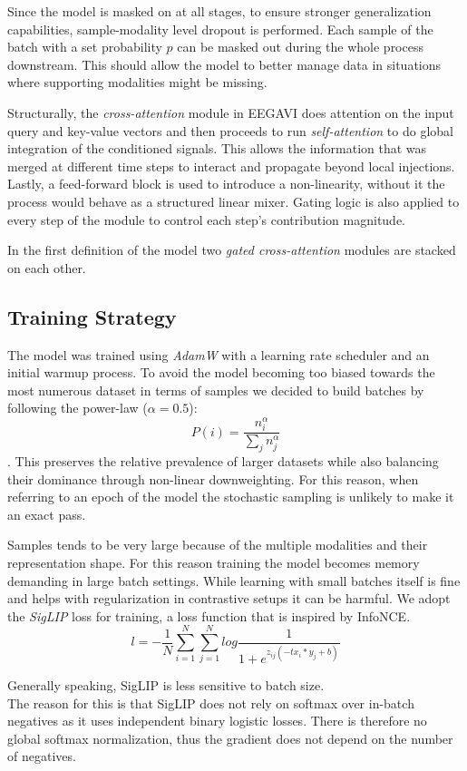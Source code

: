 Since the model is masked on at all stages, to ensure stronger generalization capabilities, sample-modality level dropout is performed.
Each sample of the batch with a set probability $p$ can be masked out during the whole process downstream.
This should allow the model to better manage data in situations where supporting modalities might be missing.

Structurally, the \textit{cross-attention} module in EEGAVI does attention on the input query and key-value vectors
and then proceeds to run \textit{self-attention} to do global integration of the conditioned signals.
This allows the information that was merged at different time steps to interact and propagate beyond local injections.
Lastly, a feed-forward block is used to introduce a non-linearity, without it the process would behave as a structured linear mixer.
Gating logic is also applied to every step of the module to control each step's contribution magnitude.

In the first definition of the model two \textit{gated cross-attention} modules are stacked on each other.

\subsection{Training Strategy}
The model was trained using \textit{AdamW} with a learning rate scheduler and an initial warmup process.
To avoid the model becoming too biased towards the most numerous dataset in terms of samples we decided to build batches by following the power-law ($\alpha=0.5$):
$$P(i) = \frac{n_i^\alpha}{\sum_{j}{n_j^\alpha}}$$.
This preserves the relative prevalence of larger datasets while also balancing their dominance through non-linear downweighting.
For this reason, when referring to an epoch of the model the stochastic sampling is unlikely to make it an exact pass.

Samples tends to be very large because of the multiple modalities and their representation shape.
For this reason training the model becomes memory demanding in large batch settings.
While learning with small batches itself is fine and helps with regularization in contrastive setups it can be harmful.
We adopt the \textit{SigLIP}\cite{zhai2023sigmoidlosslanguageimage} loss for training, a loss function that is inspired by InfoNCE.
$$l = - \frac{1}{N} \sum_{i=1}^{N} \sum_{j=1}^{N} log{\frac{1}{1 + e^{z_{ij}(-tx_i * y_j + b)}}}$$

Generally speaking, SigLIP is less sensitive to batch size.\\
The reason for this is that SigLIP does not rely on softmax over in-batch negatives as it uses independent binary logistic losses.
There is therefore no global softmax normalization, thus the gradient does not depend on the number of negatives.

